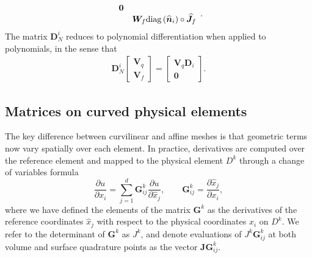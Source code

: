 \documentclass[preprint,10pt]{article}
\theoremstyle{definition}
\theoremstyle{lemma}
\theoremstyle{theorem}
\theoremstyle{assumption}
\renewcommand{\hat}{\widehat}
\renewcommand{\tilde}{\widetilde}
\newcommand{\pd}[2]{\frac{\partial#1}{\partial#2}}
\newcommand{\LRp}[1]{\left( #1 \right)}
\newcommand{\LRs}[1]{\left[ #1 \right]}
\newcommand{\note}[1]{{\color{blue}{#1}}}
\newcommand{\lcwnote}[1]{{\color{magenta}{#1}}}
\newcommand{\diag}[1]{{\rm diag}\LRp{#1}}
\begin{document}
{\begin{equation}
{\begin{array}{cc}
\bm{0}&\\
& \bm{W}_f \diag{\hat{\bm{n}}_i}\circ\hat{\bm{J}}_f
\end{array}}.
\label{eq:sbpprop1}
\end{equation}
The matrix $\bm{D}_N^i$ reduces to polynomial differentiation when applied to polynomials, in the sense that
\begin{align}
\bm{D}_N^i \LRs{\begin{array}{c}
\bm{V}_q\\
\bm{V}_f
\end{array}} = \LRs{\begin{array}{c}
\bm{V}_q\bm{D}_i\\
\bm{0}
\end{array}}.
\label{eq:dnvqvf}
\end{align}


\subsection{Matrices on curved physical elements}
\label{sec:curv}

The key difference between curvilinear and affine meshes is that geometric terms now vary spatially over each element.  In practice, derivatives are computed over the reference element and mapped to the physical element $D^k$ through a change of variables formula
\[
\pd{u}{x_i} = \sum_{j=1}^d \bm{G}^k_{ij}\pd{u}{\hat{x}_j}, \qquad \bm{G}^k_{ij} = \pd{\hat{x}_j}{x_i},
\]
where we have defined the elements of the matrix $\bm{G}^k$ as the derivatives of the reference coordinates $\hat{x}_j$ with respect to the physical coordinates $x_i$ on $D^k$.  We refer to the determinant of $\bm{G}^k$ as $J^k$, and denote evaluations of $J^k\bm{G}^k_{ij}$ at both volume and surface quadrature points  as the vector $\bm{JG}^k_{ij}$.

}
\end{document}
